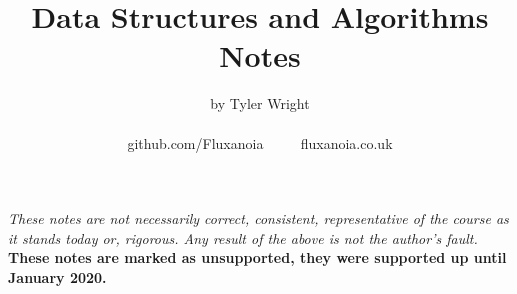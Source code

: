 \documentclass[a4paper, 12pt, twoside]{article}
\begin{document}
\title{Data Structures and Algorithms Notes}
\date{}
\author{by Tyler Wright \\
  \\
  github.com/Fluxanoia $\qquad$ fluxanoia.co.uk
}
\maketitle

\vfill

\textit{These notes are not necessarily correct,
consistent, representative of the course as it stands today or, 
rigorous. Any result of the above is not the author's fault.}
\\[\baselineskip]
\textbf{These notes are marked as unsupported, they were supported
up until January 2020.}

\addtocounter{section}{-1}



\newpage

\tableofcontents














\end{document}
